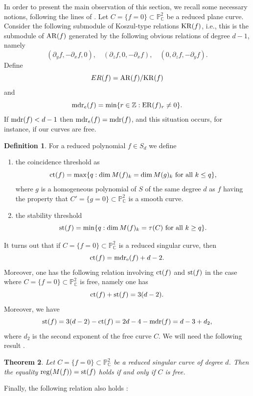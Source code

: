 \documentclass[11pt]{article}
\theoremstyle{plain}
\newtheorem{theorem}{Theorem}[section]
\theoremstyle{definition}
\newtheorem{definition}[theorem]{Definition}
\theoremstyle{remark}
\begin{document}
In order to present the main observation of this section, we recall some necessary notions, following the lines of \cite{CMD}. Let $C = \{f=0\} \subset \mathbb{P}^{2}_{\mathbb{C}}$ be a reduced plane curve. Consider the following submodule of Koszul-type relations ${\rm KR}(f)$, i.e., this is the submodule of ${\rm AR}(f)$ generated by the following obvious relations of degree $d-1$, namely
$$(\partial_{y}f, -\partial_{x}f,0), \quad (\partial_{z}f, 0, -\partial_{x}f), \quad (0, \partial_{z}f, -\partial_{y}f).$$
Define $$ER(f) = {\rm AR}(f) / {\rm KR}(f)$$
and 
$${\rm mdr}_{e}(f) = \min \{r \in \mathbb{Z} : {\rm ER}(f)_{r} \neq 0\}.$$
If ${\rm mdr}(f) < d-1$ then ${\rm mdr}_{e}(f) = {\rm mdr}(f)$, and this situation occurs, for instance, if our curves are free.
\begin{definition}
For a reduced polynomial $f \in S_{d}$ we define
\begin{enumerate}
    \item the coincidence threshold as
    $${\rm ct}(f) = \max \{q : {\rm dim} \, M(f)_{k} = {\rm dim} \, M(g)_{k} \text{ for all } k\leq q\},$$
    where $g$ is a homogeneous polynomial of $S$ of the same degree $d$ as $f$ having the property that $C' = \{g=0\}\subset \mathbb{P}^{2}_{\mathbb{C}}$ is a smooth curve.
    \item the stability threshold
    $${\rm st}(f) = \min \{q : {\rm dim} \, M(f)_{k} = \tau(C) \text{ for all } k \geq q\}.$$
\end{enumerate}
\end{definition}
\noindent
It turns out that if $C = \{f=0\}\subset \mathbb{P}^{2}_{\mathbb{C}}$ is a reduced singular curve, then
$${\rm ct}(f) = {\rm mdr_{e}}(f) + d-2.$$
Moreover, one has the following relation involving ${\rm ct}(f)$ and ${\rm st}(f)$ in the case where $C = \{f=0\} \subset \mathbb{P}^{2}_{\mathbb{C}}$ is free, namely one has
\begin{equation}
{\rm ct}(f) + {\rm st}(f) = 3(d-2).
\end{equation}
Moreover, we have 
$${\rm st}(f) = 3(d-2) - {\rm ct}(f) = 2d-4-{\rm mdr}(f)=d-3+d_{2},$$
where $d_{2}$ is the second exponent of the free curve $C$.
We will need the following result \cite[Theorem 2.6]{CMD}.
\begin{theorem}
Let $C = \{f=0\}\subset \mathbb{P}^{2}_{\mathbb{C}}$ be a reduced singular curve of degree $d$. Then the equality ${\rm reg}(M(f)) = {\rm st}(f)$ holds if and only if $C$ is free.
\end{theorem}
\noindent
Finally, the following relation also holds \cite[p. 5]{CMD}:
\end{document}
